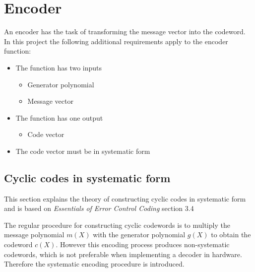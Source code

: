 \documentclass[Main]{subfiles}
\begin{document}


\chapter{Encoder}
An encoder has the task of transforming the message vector into the codeword. In this project the following additional requirements apply to the encoder function:

\begin{itemize}
\item The function has two inputs
	\begin{itemize}
	\item Generator polynomial
	\item Message vector
	\end{itemize}
\item The function has one output
	\begin{itemize}
	\item Code vector
	\end{itemize}
\item The code vector must be in systematic form
\end{itemize} 

\section{Cyclic codes in systematic form}
This section explains the theory of constructing cyclic codes in systematic form and is based on \emph{Essentials of Error Control Coding}\cite{essentials} section 3.4

The regular procedure for constructing cyclic codewords is to multiply the message polynomial $m(X)$ with the generator polynomial $g(X)$ to obtain the codeword $c(X)$. However this encoding process produces non-systematic codewords, which is not preferable when implementing a decoder in hardware. Therefore the systematic encoding procedure is introduced.
\end{document}
